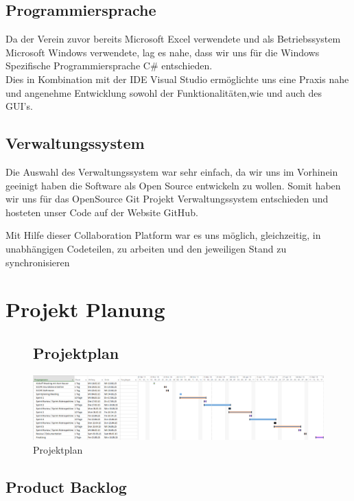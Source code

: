 \documentclass{article}
\begin{document}
\subsection{Programmiersprache}
Da der Verein zuvor bereits Microsoft Excel verwendete und als Betriebssystem Microsoft Windows verwendete, lag es nahe, dass wir uns für die Windows Spezifische Programmiersprache C\# entschieden. \\ Dies in Kombination mit der IDE Visual Studio ermöglichte uns eine Praxis nahe und angenehme Entwicklung sowohl der Funktionalitäten,wie und auch des GUI's. 

\subsection{Verwaltungssystem}
Die Auswahl des Verwaltungssystem war sehr einfach, da wir uns im Vorhinein geeinigt haben die Software als Open Source entwickeln zu wollen. Somit haben wir uns für das OpenSource Git Projekt Verwaltungssystem entschieden und hosteten unser Code auf der Website GitHub.

Mit Hilfe dieser Collaboration Platform war es uns möglich, gleichzeitig, in unabhängigen Codeteilen, zu arbeiten und den jeweiligen Stand zu synchronisieren

\newpage

\section{Projekt Planung}
	\begin{figure}[h]
		\subsection{Projektplan}
		\bigskip
		\begin{center}
			\centering
			\includegraphics[width=0.83\paperwidth]{PJPlanung}
			\caption{Projektplan}
		\end{center}
	\end{figure}	
	
\subsection{Product Backlog}
\end{document}
